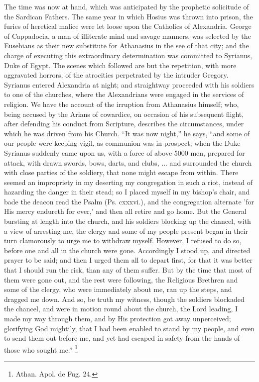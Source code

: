 The time was now at hand, which was anticipated by the prophetic
solicitude of the Sardican Fathers. The same year in which Hosius was
thrown into prison, the furies of heretical malice were let loose upon
the Catholics of Alexandria. George of Cappadocia, a man of illiterate
mind and savage manners, was selected by the Eusebians as their new
substitute for Athanasius in the see of that city; and the charge of
executing this extraordinary determination was committed to Syrianus,
Duke of Egypt. The scenes which followed are but the repetition, with
more aggravated horrors, of the atrocities perpetrated by the intruder
Gregory. Syrianus entered Alexandria at night; and straightway
proceeded with his soldiers to one of the churches, where the
Alexandrians were engaged in the services of religion. We have the
account of the irruption from Athanasius himself; who, being accused
by the Arians of cowardice, on occasion of his subsequent flight,
after defending his conduct from Scripture, describes the
circumstances, under which he was driven from his Church. ``It was
now night,'' he says, ``and some of our people were keeping
vigil, as communion was in prospect; when the Duke Syrianus suddenly
came upon us, with a force of above 5000 men, prepared for attack,
with drawn swords, bows, darts, and clubs, ... and surrounded the
church with close parties of the soldiery, that none might escape from
within. There seemed an impropriety in my deserting my congregation in
such a riot, instead of hazarding the danger in their stead; so I
placed myself in my bishop's chair, and bade the deacon read the Psalm
(Ps. cxxxvi.), and the congregation alternate 'for His mercy
endureth for ever,' and then all retire and go home. But the General
bursting at length into the church, and his soldiers blocking up the
chancel, with a view of arresting me, the clergy and some of my people
present began in their turn clamorously to urge me to withdraw myself.
However, I refused to do so, before one and all in the church were
gone. Accordingly I stood up, and directed prayer to be said; and then
I urged them all to depart first, for that it was better that I should
run the risk, than any of them suffer. But by the time that most of
them were gone out, and the rest were following, the Religious
Brethren and some of the clergy, who were immediately about me, ran up
the steps, and dragged me down. And so, be truth my witness, though
the soldiers blockaded the chancel, and were in motion round about the
church, the Lord leading, I made my way through them, and by His
protection got away unperceived; glorifying God mightily, that I had
been enabled to stand by my people, and even to send them out before
me, and yet had escaped in safety from the hands of those who sought
me.'' \footnote{Athan. Apol. de Fug. 24.}

